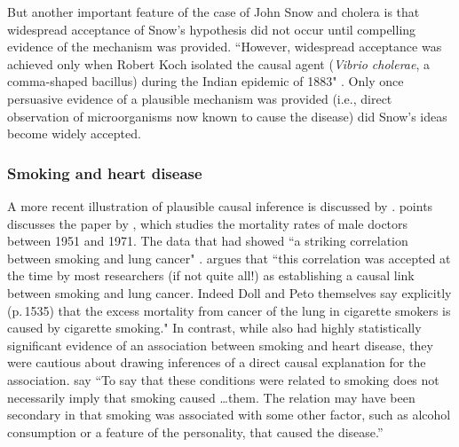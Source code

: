 \documentclass[11pt,reqno,titlepage]{amsart}
\begin{document}
\begin{doublespace}
But another important feature of the case of John Snow and cholera is that widespread acceptance of Snow's hypothesis did not occur until compelling evidence of the mechanism was provided.
``However, widespread acceptance was achieved only when Robert Koch isolated the causal agent (\emph{Vibrio cholerae}, a comma-shaped bacillus) during the Indian epidemic of 1883"  \citep[p.\,342]{Freedman:2009ur}.
Only once persuasive evidence of a plausible mechanism was provided (i.e., direct observation of microorganisms now known to cause the disease) did Snow's ideas become widely accepted.

\subsubsection{Smoking and heart disease}
A more recent illustration of plausible causal inference is discussed by \citet{Gillies2011-GILTRT-3}.
\citet{Gillies2011-GILTRT-3} points discusses the paper by \citet{Doll:1976aa}, which studies the mortality rates of male doctors between 1951 and 1971.
The data that \citet{Doll:1976aa} had showed ``a striking correlation between smoking and lung cancer" \citep[p.\,111]{Gillies2011-GILTRT-3}.
\citet{Gillies2011-GILTRT-3} argues that ``this correlation was accepted at the time by most researchers (if not quite all!) as establishing a causal link between smoking and lung cancer. Indeed Doll and Peto themselves say explicitly (p.\,1535) that the excess mortality from cancer of the lung in cigarette smokers is caused by cigarette smoking."
In contrast, while \citet{Doll:1976aa} also had highly statistically significant evidence of an association between smoking and heart disease, they were cautious about drawing inferences of a direct causal explanation for the association.
\citet[p.\,1528]{Doll:1976aa} say ``To say that these conditions were related to smoking does not necessarily imply that smoking caused \dots them. The relation may have been secondary in that smoking was associated with some other factor, such as alcohol consumption or a feature of the personality, that caused the disease.''
 

\end{doublespace}
\end{document}

